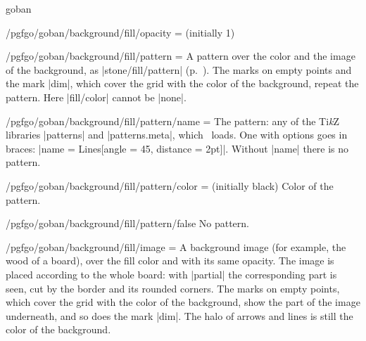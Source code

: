 \begin{environment}{{goban}}
\begin{key}{/pgfgo/goban/background/fill/opacity = (initially 1)}
\begin{codeexample}[]
			\begin{goban}[resume = a,
				background = {fill = {color = orange!40}, fill = {opacity = 0.5}}]
			\end{goban}
		\end{codeexample}

	\end{key}

	\begin{key}{/pgfgo/goban/background/fill/pattern =}
		A pattern over the color and the image of the background, as |stone/fill/pattern| (p.~\pageref{sec:piedras}). The marks on empty points and the mark |dim|, which cover the grid with the color of the background, repeat the pattern. Here |fill/color| cannot be |none|.

		\begin{codeexample}[]

			\begin{goban}[background = {fill = {
					pattern = {name = dots, color = gray}}}]
			\end{goban}
		\end{codeexample}
	\end{key}

	\begin{key}{/pgfgo/goban/background/fill/pattern/name = }
		The pattern: any of the Ti\emph{k}Z libraries |patterns| and |patterns.meta|, which \pgfgoname\ loads. One with options goes in braces: |name = {Lines[angle = 45, distance = 2pt]}|. Without |name| there is no pattern.
	\end{key}

	\begin{key}{/pgfgo/goban/background/fill/pattern/color =  (initially black)}
		Color of the pattern.
	\end{key}

	\begin{key}{/pgfgo/goban/background/fill/pattern/false}
		No pattern.
	\end{key}

	\begin{key}{/pgfgo/goban/background/fill/image =}
		A background image (for example, the wood of a board), over the fill color and with its same opacity. The image is placed according to the whole board: with |partial| the corresponding part is seen, cut by the border and its rounded corners. The marks on empty points, which cover the grid with the color of the background, show the part of the image underneath, and so does the mark |dim|. The halo of arrows and lines is still the color of the background.


\end{key}
\end{environment}
